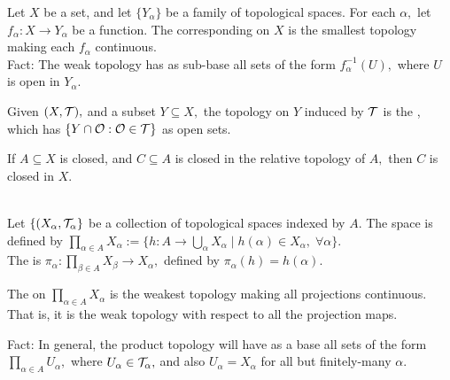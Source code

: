 \begin{defn}
Let $X$ be a set, and let $\{Y_{\alpha}\}$ be a family of topological spaces. For each $\alpha,$ let $f_{\alpha}:X\rightarrow Y_{\alpha}$ be a function. The corresponding  on $X$ is the smallest topology making each $f_{\alpha}$ continuous. \\
Fact: The weak topology has as sub-base all sets of the form $f_{\alpha}^{-1}(U),$ where $U$ is open in $Y_{\alpha}.$
\end{defn}

\begin{defn}
Given $(X,\mathcal{T}),$ and a subset $Y\subseteq X,$ the topology on $Y$ induced by $\mathcal{T}$ is the , which has $\{Y\cap\mathcal{O}:\mathcal{O}\in\mathcal{T}\}$ as open sets.
\end{defn}

\begin{prop}
If $A\subseteq X$ is closed, and $C\subseteq A$ is closed in the relative topology of $A,$ then $C$ is closed in $X.$ \\ \\
\end{prop}

\begin{defn}
Let $\{(X_{\alpha},\mathcal{T}_{\alpha}\}$ be a collection of topological spaces indexed by $A.$ The  space is defined by $\prod\limits_{\alpha\in A} X_{\alpha}:=\{h:A\rightarrow \bigcup\limits_{\alpha}X_{\alpha}\;|\; h(\alpha)\in X_{\alpha},\;\forall\alpha \}.$ \\ 
The  is $\pi_{\alpha}:\prod\limits_{\beta\in A} X_{\beta}\rightarrow X_{\alpha},$ defined by $\pi_{\alpha}(h)=h(\alpha).$
\end{defn}

\begin{defn}
The  on $\prod\limits_{\alpha\in A} X_{\alpha}$ is the weakest topology making all projections continuous. That is, it is the weak topology with respect to all the projection maps.
\end{defn}

\noindent Fact: In general, the product topology will have as a base all sets of the form $\prod_{\alpha\in A} U_{\alpha},$ where $U_{\alpha}\in\mathcal{T}_{\alpha},$ and also $U_{\alpha}=X_{\alpha}$ for all but finitely-many $\alpha.$

